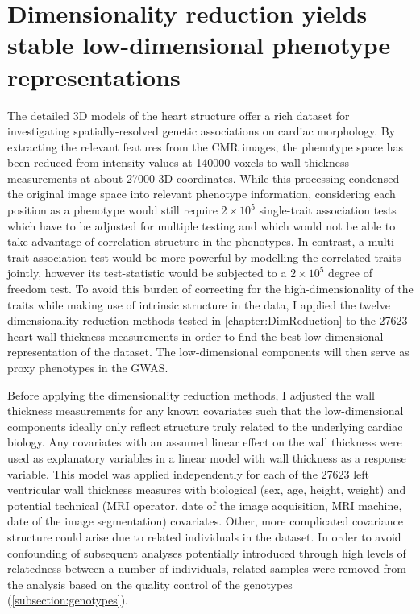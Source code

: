 \newpage
\section{Dimensionality reduction yields stable low-dimensional phenotype representations}
\label{section:DimRed-heart}
The detailed 3D models of the heart structure offer a rich dataset for investigating spatially-resolved genetic associations on cardiac morphology. By extracting the relevant features from the CMR images, the phenotype space has been reduced from intensity values at \num{140000} voxels to wall thickness measurements at about \num{27000} 3D coordinates. While this processing condensed the original image space into relevant phenotype information, considering each position as a phenotype would still require \(2\times 10^5\)  single-trait association tests which have to be adjusted for multiple testing and which would not be able to take advantage of correlation structure in the phenotypes. In contrast, a multi-trait association test would be more powerful by modelling the correlated traits jointly, however its test-statistic would be subjected to a \(2 \times 10^5\)  degree of freedom test. To avoid this burden of correcting for the high-dimensionality of the traits while making use of intrinsic structure in the data, I applied the twelve dimensionality reduction methods tested in \cref{chapter:DimReduction} to the \num{27623} heart wall thickness measurements in order to find the best low-dimensional representation of the dataset. The low-dimensional components will then serve as proxy phenotypes in the GWAS.

Before applying the dimensionality reduction methods, I adjusted the wall thickness measurements for any known covariates such that the low-dimensional components ideally only reflect structure truly related to the underlying cardiac biology. Any covariates with an assumed linear effect on the wall thickness were used as explanatory variables in a linear model with wall thickness as a response variable. This model was applied independently for each of the \num{27623} left ventricular wall thickness measures with biological (sex, age, height, weight) and potential technical (MRI operator, date of the image acquisition, MRI machine, date of the image segmentation) covariates. Other, more complicated covariance structure could arise due to related individuals in the dataset. In order to avoid confounding of subsequent analyses potentially introduced through high levels of relatedness between a number of individuals, related samples were removed from the analysis based on the quality control of the genotypes (\cref{subsection:genotypes}). 

